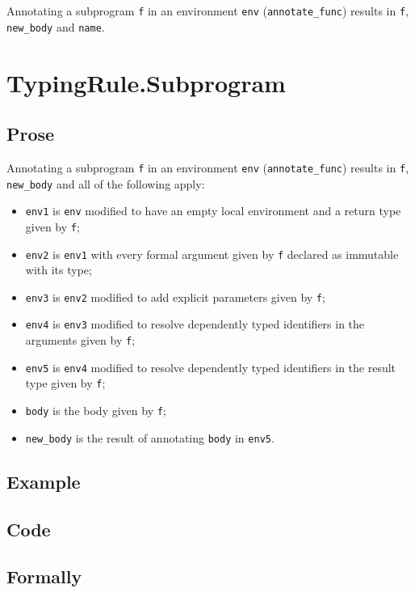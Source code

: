 \documentclass{book}
\begin{document}
Annotating a subprogram \texttt{f} in an environment \texttt{env}
(\texttt{annotate\_func}) results in \texttt{f}, \texttt{new\_body} and
\texttt{name}.

\section{TypingRule.Subprogram \label{sec:TypingRule.Subprogram}}

  \subsection{Prose}
Annotating a subprogram \texttt{f} in an environment \texttt{env}
(\texttt{annotate\_func}) results in \texttt{f}, \texttt{new\_body} and all of
the following apply:
 \begin{itemize}
   \item \texttt{env1} is \texttt{env} modified to have an empty local
     environment and a return type given by \texttt{f};
   \item \texttt{env2} is \texttt{env1} with every formal argument given by
     \texttt{f} declared as immutable with its type;
   \item \texttt{env3} is \texttt{env2} modified to add explicit parameters
     given by \texttt{f};
   \item \texttt{env4} is \texttt{env3} modified to resolve dependently typed
     identifiers in the arguments given by \texttt{f};
   \item \texttt{env5} is \texttt{env4} modified to resolve dependently typed
     identifiers in the result type given by \texttt{f};
   \item \texttt{body} is the body given by \texttt{f};
   \item \texttt{new\_body} is the result of annotating \texttt{body} in
     \texttt{env5}.
 \end{itemize} 

  \subsection{Example}

  \subsection{Code}

\begin{emptyformal}
    \subsection{Formally}
\end{emptyformal}
\end{document}
